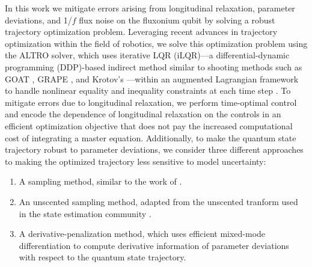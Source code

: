 In this work we mitigate
errors arising from longitudinal relaxation, parameter deviations, and 1/$f$ flux noise
on the fluxonium qubit \cite{zhang2020universal} by solving a robust trajectory 
optimization problem. 
Leveraging recent advances in trajectory optimization within the field of robotics, we
solve this optimization problem using the ALTRO solver, which uses iterative LQR 
(iLQR)---a differential-dynamic programming (DDP)-based indirect method similar to shooting
methods such as GOAT \cite{machnes2015gradient}, GRAPE
\cite{khaneja2005optimal, leung2017speedup}, and Krotov's \cite{goerz2019krotov}---within 
an augmented Lagrangian framework to handle nonlinear equality and inequality constraints at 
each time step \cite{howell2019altro}. 
To mitigate errors due to longitudinal
relaxation, we perform time-optimal control and
encode the dependence of longitudinal relaxation
on the controls in an efficient optimization objective that does
not pay the increased computational cost of integrating a master equation.
Additionally, to make the quantum state trajectory robust to parameter deviations,
we consider three different approaches to making the optimized trajectory less 
sensitive to model uncertainty:
\begin{enumerate}
\item A sampling method, similar to the work of \cite{carvalho2020error, reinhold2019controlling,
  rembold2020introduction}.
  \item An unscented sampling method, adapted from the unscented tranform used in the 
    state estimation community \cite{howell2020direct, julier2004unscented,
      lee2013sigma, manchester2016derivative}.
  \item A derivative-penalization method, which uses efficient mixed-mode differentiation
  to compute derivative information of parameter deviations with respect to the 
  quantum state trajectory.
\end{enumerate}

